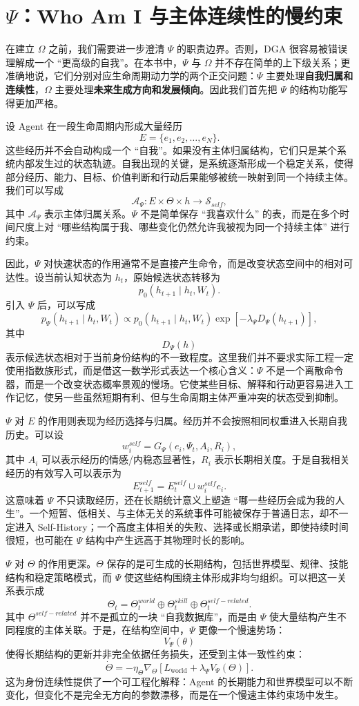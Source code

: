 \section{$\Psi$：Who Am I 与主体连续性的慢约束}

在建立 $\Omega$ 之前，我们需要进一步澄清 $\Psi$ 的职责边界。否则，DGA 很容易被错误理解成一个 ``更高级的自我''。在本书中，$\Psi$ 与 $\Omega$ 并不存在简单的上下级关系；更准确地说，它们分别对应生命周期动力学的两个正交问题：$\Psi$ 主要处理\textbf{自我归属和连续性}，$\Omega$ 主要处理\textbf{未来生成方向和发展倾向}。因此我们首先把 $\Psi$ 的结构功能写得更加严格。

设 Agent 在一段生命周期内形成大量经历
\[
E=
\{e_1,e_2,\ldots,e_N\}.
\]
这些经历并不会自动构成一个 ``自我''。如果没有主体归属结构，它们只是某个系统内部发生过的状态轨迹。自我出现的关键，是系统逐渐形成一个稳定关系，使得部分经历、能力、目标、价值判断和行动后果能够被统一映射到同一个持续主体。我们可以写成
\[
\mathcal A_{\Psi}
:
E\times\Theta\times h
\rightarrow
\mathcal S_{self},
\]
其中 $\mathcal A_{\Psi}$ 表示主体归属关系。$\Psi$ 不是简单保存 ``我喜欢什么'' 的表，而是在多个时间尺度上对 ``哪些结构属于我、哪些变化仍然允许我被视为同一个持续主体'' 进行约束。

因此，$\Psi$ 对快速状态的作用通常不是直接产生命令，而是改变状态空间中的相对可达性。设当前认知状态为 $h_t$，原始候选状态转移为
\[
p_0(h_{t+1}\mid h_t,W_t).
\]
引入 $\Psi$ 后，可以写成
\[
p_{\Psi}
(h_{t+1}\mid h_t,W_t)
\propto
p_0(h_{t+1}\mid h_t,W_t)
\exp
\left[
-\lambda_{\Psi}
D_{\Psi}
(h_{t+1})
\right],
\]
其中
\[
D_{\Psi}(h)
\]
表示候选状态相对于当前身份结构的不一致程度。这里我们并不要求实际工程一定使用指数族形式，而是借这一数学形式表达一个核心含义：$\Psi$ 不是一个离散命令器，而是一个改变状态概率景观的慢场。它使某些目标、解释和行动更容易进入工作记忆，使另一些虽然短期有利、但与生命周期主体严重冲突的状态受到抑制。

$\Psi$ 对 $E$ 的作用则表现为经历选择与归属。经历并不会按照相同权重进入长期自我历史。可以设
\[
w_i^{self}
=
G_{\Psi}
\left(
e_i,
\Psi_t,
A_i,
R_i
\right),
\]
其中 $A_i$ 可以表示经历的情感/内稳态显著性，$R_i$ 表示长期相关度。于是自我相关经历的有效写入可以表示为
\[
E^{self}_{t+1}
=
E^{self}_t
\cup
w_i^{self}e_i.
\]
这意味着 $\Psi$ 不只读取经历，还在长期统计意义上塑造 ``哪一些经历会成为我的人生''。一个短暂、低相关、与主体无关的系统事件可能被保存于普通日志，却不一定进入 Self-History；一个高度主体相关的失败、选择或长期承诺，即使持续时间很短，也可能在 $\Psi$ 结构中产生远高于其物理时长的影响。

$\Psi$ 对 $\Theta$ 的作用更深。$\Theta$ 保存的是可生成的长期结构，包括世界模型、规律、技能结构和稳定策略模式，而 $\Psi$ 使这些结构围绕主体形成非均匀组织。可以把这一关系表示成
\[
\Theta_t
=
\Theta_t^{world}
\oplus
\Theta_t^{skill}
\oplus
\Theta_t^{self-related}.
\]
其中 $\Theta^{self-related}$ 并不是孤立的一块 ``自我数据库''，而是由 $\Psi$ 使大量结构产生不同程度的主体关联。于是，在结构空间中，$\Psi$ 更像一个慢速势场：
\[
V_{\Psi}(\theta)
\]
使得长期结构的更新并非完全依据任务损失，还受到主体一致性约束：
\[
\dot{\Theta}
=
-\eta_{\Theta}
\nabla_{\Theta}
\left[
L_{\text{world}}
+
\lambda_{\Psi}
V_{\Psi}(\Theta)
\right].
\]
这为身份连续性提供了一个可工程化解释：Agent 的长期能力和世界模型可以不断变化，但变化不是完全无方向的参数漂移，而是在一个慢速主体约束场中发生。

